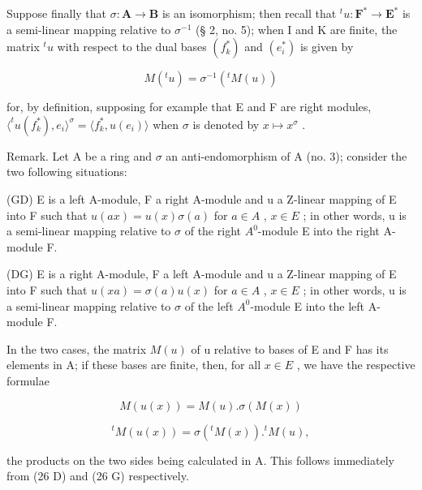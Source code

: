 Suppose finally that \(\sigma: \mathbf{A} \to \mathbf{B}\) is an isomorphism; then recall that \(^t u: \mathbf{F}^* \to \mathbf{E}^*\) is a semi-linear mapping relative to \(\sigma^{-1}\) (§ 2, no. 5); when I and K are finite, the matrix \(^t u\) with respect to the dual bases \((f_k^*)\) and \((e_i^*)\) is given by

\[
M (^ {t} u) = \sigma^ {- 1} (^ {t} M (u))\tag{28}
\]

for, by definition, supposing for example that E and F are right modules, \(\langle^t u(f_k^*), e_i \rangle^\sigma = \langle f_k^*, u(e_i) \rangle\) when \(\sigma\) is denoted by \(x \mapsto x^\sigma\) .

Remark. Let A be a ring and \(\sigma\) an anti-endomorphism of A (no. 3); consider the two following situations:

(GD) E is a left A-module, F a right A-module and u a Z-linear mapping of E into F such that \(u(ax) = u(x)\sigma(a)\) for \(a \in A\) , \(x \in E\) ; in other words, u is a semi-linear mapping relative to \(\sigma\) of the right \(A^{0}\)-module E into the right A-module F.

(DG) E is a right A-module, F a left A-module and u a Z-linear mapping of E into F such that \(u(xa) = \sigma(a)u(x)\) for \(a \in A\) , \(x \in E\) ; in other words, u is a semi-linear mapping relative to \(\sigma\) of the left \(A^{0}\)-module E into the left A-module F.

In the two cases, the matrix \(M(u)\) of u relative to bases of E and F has its elements in A; if these bases are finite, then, for all \(x \in E\) , we have the respective formulae

\[
M (u (x)) = M (u). \sigma (M (x))\tag{17 GD}
\]

\[
{ } ^ { t } M ( u ( x ) ) = \sigma ( { } ^ { t } M ( x ) ) . { } ^ { t } M ( u ) ,\tag{17 DG}
\]

the products on the two sides being calculated in A. This follows immediately from (26 D) and (26 G) respectively.

